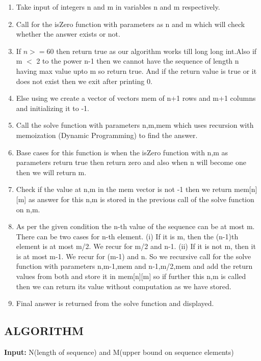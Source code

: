 \documentclass[conference]{IEEEtran}
\begin{document}
\begin{enumerate}
\item Take input of integers n and m in variables n and m respectively. 
\item Call for the isZero function with parameters as n and m which will check whether the answer exists or not. 
\item If $n>=60$ then return true as our algorithm works till long long int.Also if m $<$ 2 to the power n-1 then we cannot have the sequence of length n having max value upto m so return true. And if the return value is true or it does not exist then we exit after printing 0.
\item Else using we create a vector of vectors mem of n+1 rows and m+1 columns and initializing it to -1.
\item Call the solve function with parameters n,m,mem which uses recursion with memoization (Dynamic Programming) to find the answer.
\item Base cases for this function is when the isZero function with n,m as parameters return true then return zero and also when n will become one then we will return m.
\item Check if the value at n,m in the mem vector is not -1 then we return mem[n][m] as answer for this n,m is stored in the previous call of the solve function on n,m.
\item As per the given condition the n-th value of the sequence can be at most m. There can be two cases for n-th element.
\newline
   (i) If it is m, then the (n-1)th element is at most m/2. We recur for m/2 and n-1.
   \newline
   (ii) If it is not m, then it is at most m-1. We recur for (m-1) and n.
   \newline
 So we recursive call for the solve function with parameters  n,m-1,mem and n-1,m/2,mem and add the return values from both and store it in mem[n][m] so if further this n,m is called then we can  return its value without computation as we have stored.
\item Final answer is returned from the solve function and displayed.


\end{enumerate}

\subsection{ALGORITHM }

\textbf{Input:} N(length of sequence) and M(upper bound on sequence elements)
\end{document}
